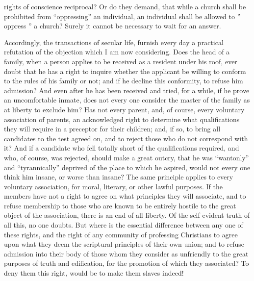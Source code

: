 \documentclass[
]{book}
\begin{document}
rights of conscience reciprocal? Or do they demand, that while a church shall be prohibited from ``oppressing'' an individual, an individual shall be allowed to '' oppress '' a church? Surely it cannot be necessary to wait for an answer.

Accordingly, the transactions of secular life, furnish every day a practical refutation of the objection which I am now considering. Does the head of a family, when a person applies to be received as a resident under his roof, ever doubt that he has a right to inquire whether the applicant be willing to conform to the rules of his family or not; and if he decline this conformity, to refuse him admission? And even after he has been received and tried, for a while, if he prove an uncomfortable inmate, does not every one consider the master of the family as at liberty to exclude him? Has not every parent, and, of course, every voluntary association of parents, an acknowledged right to determine what qualifications they will require in a preceptor for their children; and, if so, to bring all candidates to the test agreed on, and to reject those who do not correspond with it? And if a candidate who fell totally short of the qualifications required, and who, of course, was rejected, should make a great outcry, that he was ``wantonly'' and ``tyrannically'' deprived of the place to which he aspired, would not every one think him insane, or worse than insane? The same principle applies to every voluntary association, for moral, literary, or other lawful purposes. If the members have not a right to agree on what principles they will associate, and to refuse membership to those who are known to be entirely hostile to the great object of the association, there is an end of all liberty. Of the self evident truth of all this, no one doubts. But where is the essential difference between any one of these rights, and the right of any community of professing Christians to agree upon what they deem the scriptural principles of their own union; and to refuse admission into their body of those whom they consider as unfriendly to the great purposes of truth and edification, for the promotion of which they associated? To deny them this right, would be to make them slaves indeed!
\end{document}
